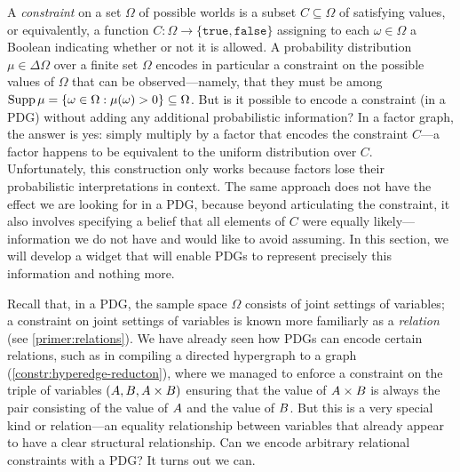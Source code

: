 A \emph{constraint} on a set $\Omega$ of possible worlds is a subset $C \subseteq \Omega$
of satisfying values, or equivalently, 
a function $C : \Omega \to \{\mathtt{true}, \mathtt{false}\}$ assigning to each $\omega \in \Omega$ a Boolean indicating whether or not it is allowed. 
%
A probability distribution $\mu \in \Delta \Omega$ over 
    a finite set $\Omega$ encodes in particular a constraint
    on the possible values of $\Omega$ that can be observed---namely, that
they must be among $\operatorname{\mathrm{Supp}} \mu = \{ \omega \in \Omega : \mu(\omega) > 0 \} \subseteq \Omega$. 
%
But is it possible to encode a constraint (in a PDG) without adding any additional probabilistic information?
%
%
In a factor graph, the answer is yes: simply multiply by a factor that encodes the constraint $C$---a factor happens to be equivalent to the uniform distribution over $C$. 
Unfortunately, this construction only works because factors lose their probabilistic interpretations in context.
The same approach does not have the effect we are looking for in a PDG, because beyond articulating the constraint, it also involves specifying a belief that all elements of $C$ were equally likely---information we do not have and would like to avoid assuming. 
In this section, we will develop a widget that will enable PDGs to represent precisely this information and nothing more. 

    
Recall that, in a PDG, the sample space $\Omega$ consists of joint settings of variables;
a constraint on joint settings of variables is known more familiarly as a
\emph{relation} (see \cref{primer:relations}).
We have already seen how PDGs can encode certain relations, such as
in compiling a directed hypergraph to a graph (\cref{constr:hyperedge-reducton}),
where we managed to enforce a constraint on the triple of variables $({A}, {B}, {A}\times {B})$ ensuring that the value of ${A} \times {B}$ is always the pair consisting of the value of ${A}$ and the value of ${B}$.
But this is a very special kind or relation---an equality relationship between variables that already appear to have a clear structural relationship.
Can we encode arbitrary relational constraints with a PDG? 
It turns out we can.

